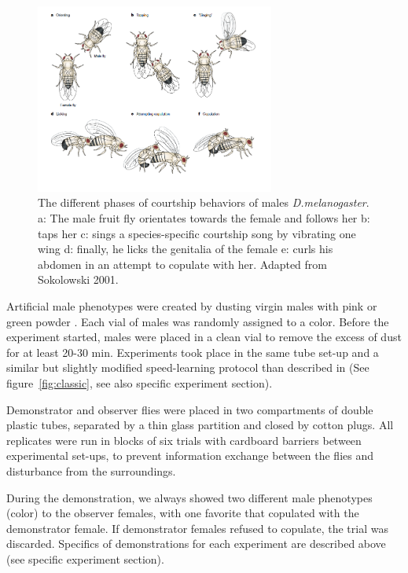\documentclass[a4paper, 12pt]{article}
\begin{document}
		\begin{figure}
		\centering
		\includegraphics[width=0.7\textwidth]{images/courtcomp}
		\caption{The different phases of courtship behaviors of males \textit{D.melanogaster}.\\
			a: The male fruit fly orientates towards the female and follows her
			b: taps her 
			c: sings a species-specific courtship song by vibrating one wing
			d: finally, he licks the genitalia of the female 
			e: curls his abdomen in an attempt to copulate with her.
			Adapted from Sokolowski 2001.}
		\label{fig:court}
	\end{figure}
	Artificial male phenotypes were created by dusting virgin males with pink or green powder \parencite{mery_public_2009}. Each vial of males was randomly assigned to a color. Before the experiment started, males were placed in a clean vial to remove the excess of dust for at least 20-30 min. Experiments took place in the same tube set-up and a similar but slightly modified speed-learning protocol than described in \textcite{dagaeff_drosophila_2016} (See figure~\ref{fig:classic}, see also specific experiment section).
		

	Demonstrator and observer flies were placed in two compartments of double plastic tubes, separated by a thin glass partition and closed by cotton plugs. All replicates were run in blocks of six trials with cardboard barriers between experimental set-ups, to prevent information exchange between the flies and disturbance from the surroundings. 
	
	During the demonstration, we always showed two different male phenotypes (color) to the observer females, with one favorite that copulated with the demonstrator female. If demonstrator females refused to copulate, the trial was discarded. Specifics of demonstrations for each experiment are described above (see specific experiment section).
	
\end{document}
